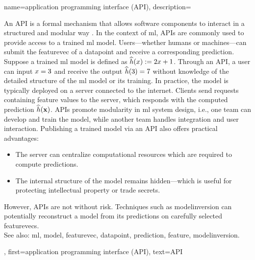 {name={application programming interface (API)},
		description={An  API is a formal mechanism that 
			allows software components to interact in a structured and modular way \cite{RestfulBook2013}.
			In the context of \gls{ml}, APIs are commonly used to provide access to a trained \gls{ml} \gls{model}. 
			Users—whether humans or machines—can submit the \gls{featurevec} of a \gls{datapoint} and receive 
			a corresponding \gls{prediction}. Suppose a trained \gls{ml} \gls{model} is defined 
			as $\widehat{h}(x) := 2 x + 1$. Through an API, a user 
			can input $x = 3$ and receive the output $\widehat{h}(3) = 7$ 
			without knowledge of the detailed structure of the \gls{ml} \gls{model} or its training. 
			In practice, the \gls{model} is typically deployed on a server connected to the internet. 
			Clients send requests containing \gls{feature} values to the server, which responds with 
			the computed \gls{prediction} $\widehat{h}({\bf x})$. APIs promote modularity 
			in \gls{ml} system design, i.e., one team can develop and train the \gls{model}, while another team
			handles integration and user interaction. Publishing a trained \gls{model} via an API also 
			offers practical advantages: 
			\begin{itemize} 
				\item The server can centralize computational resources which are required to compute \glspl{prediction}. 
		        \item The internal structure of the \gls{model} remains hidden—which is useful for protecting intellectual property or trade secrets. 
		    	\end{itemize} 
			However, APIs are not without \gls{risk}. Techniques such as \gls{modelinversion} can potentially reconstruct a 
			\gls{model} from its \glspl{prediction} on carefully selected \glspl{featurevec}.
					\\
			See also: \gls{ml}, \gls{model}, \gls{featurevec}, \gls{datapoint}, \gls{prediction}, \gls{feature}, \gls{modelinversion}.},
		first={application programming interface (API)},
		text={API}
}


